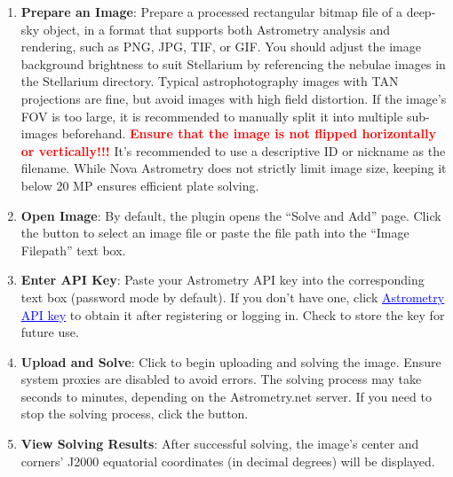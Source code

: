 \begin{enumerate}
    \item \textbf{Prepare an Image}: Prepare a processed rectangular bitmap file of a deep-sky object, 
	in a format that supports both Astrometry analysis and rendering, such as PNG, JPG, TIF, or GIF. 
	You should adjust the image background brightness to suit Stellarium 
	by referencing the nebulae images in the Stellarium  directory. Typical 
	astrophotography images with TAN projections are fine, but avoid images with high field distortion. 
	If the image's FOV is too large, it is recommended to manually split it into multiple sub-images beforehand. 
	\textbf{\textcolor{red}{Ensure that the image is not flipped horizontally or vertically!!!}} 
	It’s recommended to use a descriptive ID or nickname as the filename. 
	While Nova Astrometry does not strictly limit image size, keeping it below 20 MP 
	ensures efficient plate solving.

    \item \textbf{Open Image}: By default, the plugin opens the “Solve and Add” page. Click the  
	button to select an image file or paste the file path into the “Image Filepath” text box.

    \item \textbf{Enter API Key}: Paste your Astrometry API key into the corresponding text box (password 
	mode by default). If you don’t have one, click \href{https://nova.astrometry.net/api_help}{\textcolor{blue}{\underline{Astrometry API key}}} to obtain it 
	after registering or logging in. Check  to store the key for future use.

    \item \textbf{Upload and Solve}: Click  to begin uploading and solving the image. Ensure system 
	proxies are disabled to avoid errors. The solving process may take seconds to minutes, 
	depending on the Astrometry.net server. If you need to stop the solving process, click the  button.

    \item \textbf{View Solving Results}: After successful solving, the image's center and corners' J2000 
	equatorial coordinates (in decimal degrees) will be displayed.


\end{enumerate}
